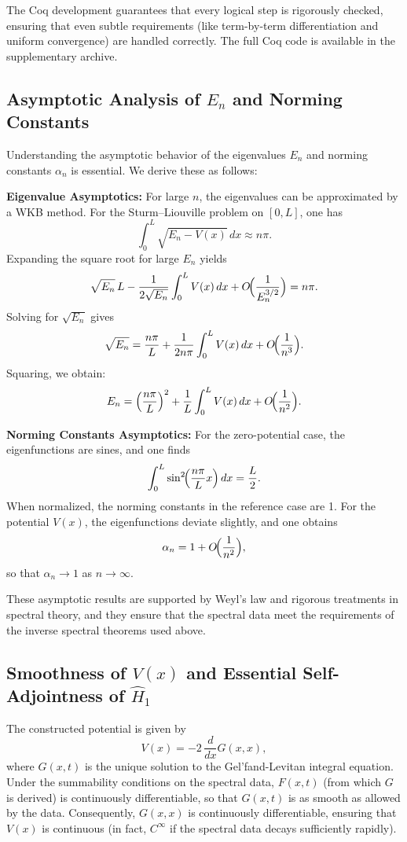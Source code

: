 \documentclass[12pt]{article}
\begin{document}
The Coq development guarantees that every logical step is rigorously checked, ensuring that even subtle requirements (like term-by-term differentiation and uniform convergence) are handled correctly. The full Coq code is available in the supplementary archive.

\subsection*{Asymptotic Analysis of \(E_n\) and Norming Constants}

Understanding the asymptotic behavior of the eigenvalues \(E_n\) and norming constants \(\alpha_n\) is essential. We derive these as follows:

\textbf{Eigenvalue Asymptotics:} For large \(n\), the eigenvalues can be approximated by a WKB method. For the Sturm–Liouville problem on \([0,L]\), one has
\[
\int_0^L \sqrt{E_n - V(x)}\,dx \approx n\pi.
\]
Expanding the square root for large \(E_n\) yields
\[
\sqrt{E_n}\,L - \frac{1}{2\sqrt{E_n}}\int_0^L V(x)\,dx + O\!\Bigl(\frac{1}{E_n^{3/2}}\Bigr)= n\pi.
\]
Solving for \(\sqrt{E_n}\) gives
\[
\sqrt{E_n} = \frac{n\pi}{L} + \frac{1}{2n\pi}\int_0^L V(x)\,dx + O\!\Bigl(\frac{1}{n^3}\Bigr).
\]
Squaring, we obtain:
\[
E_n = \left(\frac{n\pi}{L}\right)^2 + \frac{1}{L}\int_0^L V(x)\,dx + O\!\Bigl(\frac{1}{n^2}\Bigr).
\]

\textbf{Norming Constants Asymptotics:} For the zero-potential case, the eigenfunctions are sines, and one finds
\[
\int_0^L \sin^2\!\Bigl(\frac{n\pi}{L}x\Bigr)\,dx = \frac{L}{2}.
\]
When normalized, the norming constants in the reference case are 1. For the potential \(V(x)\), the eigenfunctions deviate slightly, and one obtains
\[
\alpha_n = 1 + O\!\Bigl(\frac{1}{n^2}\Bigr),
\]
so that \(\alpha_n \to 1\) as \(n\to\infty\).

These asymptotic results are supported by Weyl's law and rigorous treatments in spectral theory, and they ensure that the spectral data meet the requirements of the inverse spectral theorems used above.

\subsection*{Smoothness of \(V(x)\) and Essential Self-Adjointness of \(\hat{H}_1\)}

The constructed potential is given by
\[
V(x) = -2\,\frac{d}{dx}G(x,x),
\]
where \(G(x,t)\) is the unique solution to the Gel’fand-Levitan integral equation. Under the summability conditions on the spectral data, \(F(x,t)\) (from which \(G\) is derived) is continuously differentiable, so that \(G(x,t)\) is as smooth as allowed by the data. Consequently, \(G(x,x)\) is continuously differentiable, ensuring that \(V(x)\) is continuous (in fact, \(C^\infty\) if the spectral data decays sufficiently rapidly).
\end{document}
